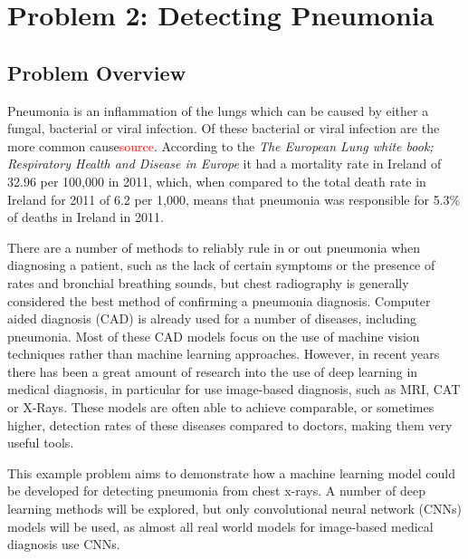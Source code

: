 \documentclass[12pt,a4paper,titlepage,twoside]{report}
\newcommand\todo[1]{\textcolor{red}{#1}}
\begin{document}
\chapter{Problem 2: Detecting Pneumonia}
\section{Problem Overview}
	Pneumonia is an inflammation of the lungs which can be caused by either a fungal, bacterial or viral infection. Of these bacterial or viral infection are the more common cause\todo{source}. According to the \textit{The European Lung white book; Respiratory Health and Disease in Europe} it had a mortality rate in Ireland of 32.96 per 100,000 in 2011\cite{pne-death-rate}, which, when compared to the total death rate in Ireland for 2011 of 6.2 per 1,000, means that pneumonia was responsible for 5.3\% of deaths in Ireland in 2011. \par
	There are a number of methods to reliably rule in or out pneumonia when diagnosing a patient, such as the lack of certain symptoms or the presence of rates and bronchial breathing sounds, but chest radiography is generally considered the best method of confirming a pneumonia diagnosis\cite{pne-diagnosis}. Computer aided diagnosis (CAD) is already used for a number of diseases, including pneumonia\cite{cad-wavelet}. Most of these CAD models focus on the use of machine vision techniques rather than machine learning approaches. However, in recent years there has been a great amount of research into the use of deep learning in medical diagnosis, in particular for use image-based diagnosis, such as MRI, CAT or X-Rays\cite{pne-ml-in-medicine}. These models are often able to achieve comparable, or sometimes higher, detection rates of these diseases compared to doctors, making them very useful tools. \par
	This example problem aims to demonstrate how a machine learning model could be developed for detecting pneumonia from chest x-rays. A number of deep learning methods will be explored, but only convolutional neural network (CNNs) models will be used, as almost all real world models for image-based medical diagnosis use CNNs\cite{pne-ml-in-medicine}. \par
\end{document}
